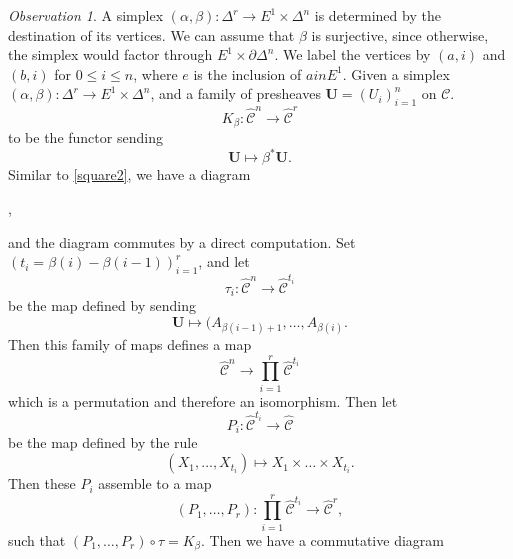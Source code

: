 \documentclass[leqno]{article}
\numberwithin{equation}{subsection}
\theoremstyle{plain}   %
\theoremstyle{remark}
\newtheorem{obs}[equation]{Observation}
\theoremstyle{plain}
\DeclareMathOperator{\id}{id}
\newcommand{\overcat}[2]{{\left(#1\downarrow #2\right)}}
\newcommand{\psh}[1]{\ensuremath{\widehat{#1}}}
\newcommand{\C}{\ensuremath{\mathcal{C}}}
\newcommand{\ssetlab}{\ensuremath{\widehat{\Delta} \int \widehat{\mathcal{C}}}}
\begin{document}
\begin{obs}\label{joyalsquare2}
	A simplex \((\alpha,\beta):\Delta^r \to E^1\times \Delta^n\) is determined by the destination of its vertices. We can assume that \(\beta\) is surjective, since otherwise, the simplex would factor through \(E^1\times \partial \Delta^n\).     We label the vertices by \((a,i)\) and \((b,i)\) for \(0\leq i \leq n\), where \(e\) is the inclusion of \(a in E^1\).  Given a simplex \((\alpha,\beta):\Delta^r\to E^1\times \Delta^n\), and a family of presheaves \(\mathbf{U}=(U_i)_{i=1}^n\) on \(\C\). 
	\[K_{\beta}:\psh{\C}^n \to \psh{\C}^r\]
	to be the functor sending
	\[\mathbf{U} \mapsto \beta^\ast \mathbf{U}.\]
	Similar to \ref{square2}, we have a diagram
	\begin{center}
		,
	\end{center}
	and the diagram commutes by a direct computation.  
	Set \((t_i=\beta(i) - \beta(i-1))_{i=1}^r\), and let 
	\[\tau_i:\psh{\C}^n \to \psh{\C}^{t_i}\]
	be the map defined by sending 
	\[\mathbf{U}\mapsto (A_{\beta(i-1)+1},\dots,A_{\beta(i)}.\]
	Then this family of maps defines a map 
	\[\psh{\C}^n \to \prod_{i=1}^r\psh{\C}^{t_i}\]
	which is a permutation and therefore an isomorphism. Then let
	\[P_i:\psh{\C}^{t_i} \to \psh{\C}\]
	be the map defined by the rule 
	\[(X_1,\dots,X_{t_i})\mapsto X_1\times \dots \times X_{t_i}.\]
	Then these \(P_i\) assemble to a map 
	\[(P_1,\dots,P_r): \prod_{i=1}^r \psh{\C}^{t_i} \to \psh{\C}^r,\]
	such that \((P_1,\dots,P_r)\circ \tau = K_\beta\).
	Then we have a commutative diagram
	\begin{center}
\end{center}
\end{obs}
\end{document}
